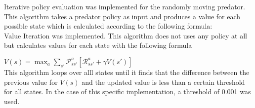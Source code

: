 Iterative policy evaluation was implemented for the randomly moving predator. This algorithm takes a predator policy as input and produces a value for each possible state which is calculated according to the following formula: \\

Value Iteration was implemented. This algorithm does not uses any policy at all but calculates values for each state with the following formula

\begin{math}
  V(s) = \max_a \sum_{s'} \mathcal{P}_{ss'}^a \left[\mathcal{R}_{ss'}^a + \gamma V(s') \right]
\end{math} \\

This algorithm loops over alll states until it finds that the difference between the previous value for $V(s)$ and the updated value is less than a certain threshold for all states. In the case of this specific implementation, a threshold of 0.001 was used.